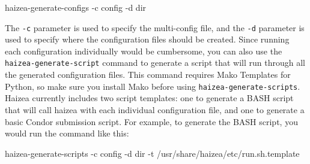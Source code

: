\begin{wideshellverbatim}
haizea-generate-configs -c config -d dir
\end{wideshellverbatim}

The \texttt{-c} parameter is used to specify the multi-config file, and the \texttt{-d} parameter is used to specify where the configuration files should be created. Since running each configuration individually would be cumbersome, you can also use the \texttt{haizea-generate-script} command to generate a script that will run through all the generated configuration files. This command requires Mako Templates for Python, so make sure you install Mako before using \texttt{haizea-generate-scripts}. Haizea currently includes two script templates: one to generate a BASH script that will call haizea with each individual configuration file, and one to generate a basic Condor submission script. For example, to generate the BASH script, you would run the command like this:

\begin{wideshellverbatim}
haizea-generate-scripts -c config -d dir -t /usr/share/haizea/etc/run.sh.template
\end{wideshellverbatim}
